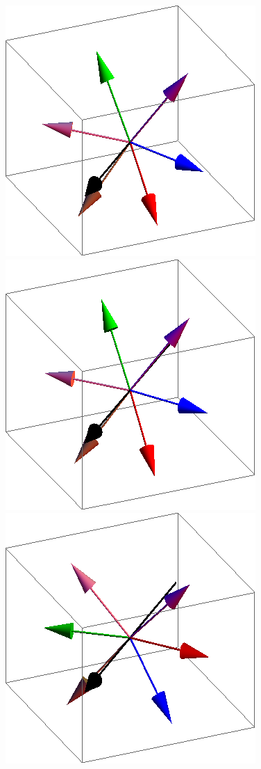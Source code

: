 \documentclass{article}
\begin{document}
\begin{figure}[ht]
\centering
\includegraphics[scale=0.33]{110/1S005to000R.png}
\includegraphics[scale=0.33]{110/241S005to000R.png}
\includegraphics[scale=0.33]{110/300S005to000R.png}

\end{figure}
\end{document}
